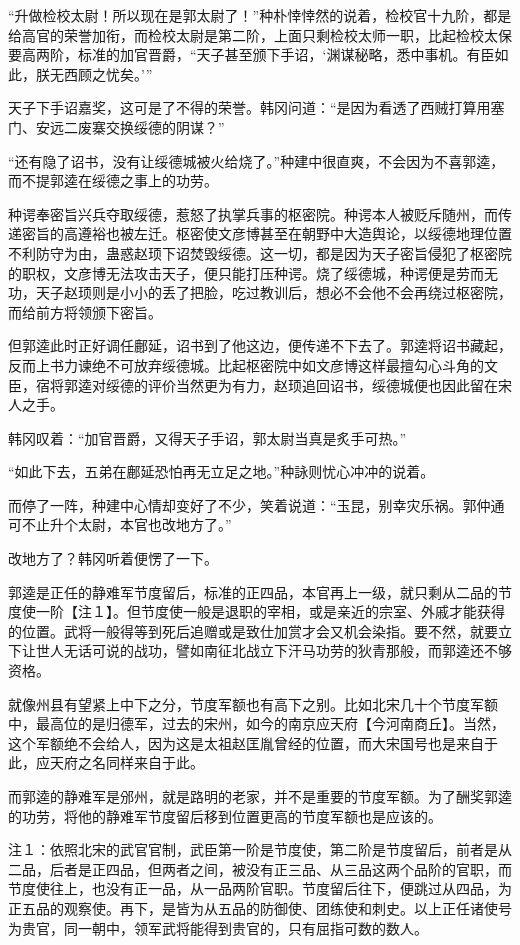 “升做检校太尉！所以现在是郭太尉了！”种朴悻悻然的说着，检校官十九阶，都是给高官的荣誉加衔，而检校太尉是第二阶，上面只剩检校太师一职，比起检校太保要高两阶，标准的加官晋爵，“天子甚至颁下手诏，‘渊谋秘略，悉中事机。有臣如此，朕无西顾之忧矣。’”

天子下手诏嘉奖，这可是了不得的荣誉。韩冈问道：“是因为看透了西贼打算用塞门、安远二废寨交换绥德的阴谋？”

“还有隐了诏书，没有让绥德城被火给烧了。”种建中很直爽，不会因为不喜郭逵，而不提郭逵在绥德之事上的功劳。

种谔奉密旨兴兵夺取绥德，惹怒了执掌兵事的枢密院。种谔本人被贬斥随州，而传递密旨的高遵裕也被左迁。枢密使文彦博甚至在朝野中大造舆论，以绥德地理位置不利防守为由，蛊惑赵顼下诏焚毁绥德。这一切，都是因为天子密旨侵犯了枢密院的职权，文彦博无法攻击天子，便只能打压种谔。烧了绥德城，种谔便是劳而无功，天子赵顼则是小小的丢了把脸，吃过教训后，想必不会他不会再绕过枢密院，而给前方将领颁下密旨。

但郭逵此时正好调任鄜延，诏书到了他这边，便传递不下去了。郭逵将诏书藏起，反而上书力谏绝不可放弃绥德城。比起枢密院中如文彦博这样最擅勾心斗角的文臣，宿将郭逵对绥德的评价当然更为有力，赵顼追回诏书，绥德城便也因此留在宋人之手。

韩冈叹着：“加官晋爵，又得天子手诏，郭太尉当真是炙手可热。”

“如此下去，五弟在鄜延恐怕再无立足之地。”种詠则忧心冲冲的说着。

而停了一阵，种建中心情却变好了不少，笑着说道：“玉昆，别幸灾乐祸。郭仲通可不止升个太尉，本官也改地方了。”

改地方了？韩冈听着便愣了一下。

郭逵是正任的静难军节度留后，标准的正四品，本官再上一级，就只剩从二品的节度使一阶【注１】。但节度使一般是退职的宰相，或是亲近的宗室、外戚才能获得的位置。武将一般得等到死后追赠或是致仕加赏才会又机会染指。要不然，就要立下让世人无话可说的战功，譬如南征北战立下汗马功劳的狄青那般，而郭逵还不够资格。

就像州县有望紧上中下之分，节度军额也有高下之别。比如北宋几十个节度军额中，最高位的是归德军，过去的宋州，如今的南京应天府【今河南商丘】。当然，这个军额绝不会给人，因为这是太祖赵匡胤曾经的位置，而大宋国号也是来自于此，应天府之名同样来自于此。

而郭逵的静难军是邠州，就是路明的老家，并不是重要的节度军额。为了酬奖郭逵的功劳，将他的静难军节度留后移到位置更高的节度军额也是应该的。

注１：依照北宋的武官官制，武臣第一阶是节度使，第二阶是节度留后，前者是从二品，后者是正四品，但两者之间，被没有正三品、从三品这两个品阶的官职，而节度使往上，也没有正一品，从一品两阶官职。节度留后往下，便跳过从四品，为正五品的观察使。再下，是皆为从五品的防御使、团练使和刺史。以上正任诸使号为贵官，同一朝中，领军武将能得到贵官的，只有屈指可数的数人。


